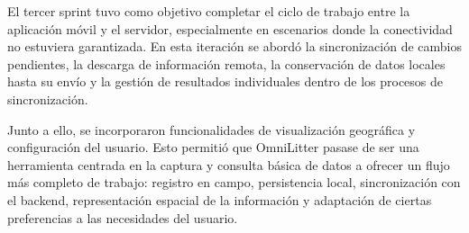 El tercer sprint tuvo como objetivo completar el ciclo de trabajo entre la
aplicación móvil y el servidor, especialmente en escenarios donde la
conectividad no estuviera garantizada. En esta iteración se abordó la
sincronización de cambios pendientes, la descarga de información remota, la
conservación de datos locales hasta su envío y la gestión de resultados
individuales dentro de los procesos de sincronización.

Junto a ello, se incorporaron funcionalidades de visualización geográfica y
configuración del usuario. Esto permitió que OmniLitter pasase de ser una
herramienta centrada en la captura y consulta básica de datos a ofrecer un flujo
más completo de trabajo: registro en campo, persistencia local, sincronización
con el backend, representación espacial de la información y adaptación de
ciertas preferencias a las necesidades del usuario.

